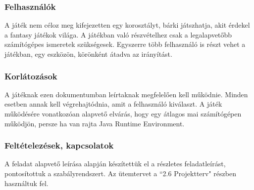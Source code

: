 \subsubsection{Felhasználók}

A játék nem céloz meg kifejezetten egy korosztályt, bárki játszhatja, akit érdekel a fantasy játékok világa. A játékban való részvételhez csak a legalapvetőbb számítógépes ismeretek szükségesek. Egyszerre több felhasználó is részt vehet a játékban, egy eszközön, körönként átadva az irányítást.

\subsubsection{Korlátozások}

A játéknak ezen dokumentumban leírtaknak megfelelően kell működnie. Minden esetben annak kell végrehajtódnia, amit a felhasználó kiválaszt. A játék működésére vonatkozóan alapvető elvárás, hogy egy átlagos mai számítógépen működjön, persze ha van rajta Java Runtime Environment.

\subsubsection{Feltételezések, kapcsolatok}

A feladat alapvető leírása alapján készítettük el a részletes feladatleírást, pontosítottuk a szabályrendszert. Az ütemtervet a ``2.6 Projektterv" részben használtuk fel.
